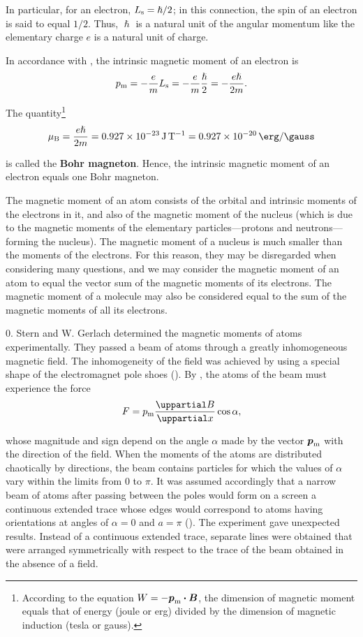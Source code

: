 \noindent
In particular, for an electron, $L_{\text{s}}=\hslash/2$; in this connection, the spin of an electron is said to equal $1/2$.
Thus, $\hslash$ is a natural unit of the angular momentum like the elementary charge $e$ is a natural unit of charge.

In accordance with , the intrinsic magnetic moment of an electron is
\begin{equation}\label{eq:7_44}
    p_{\text{m}} = - \frac{e}{m} L_{\text{s}} = - \frac{e}{m} \frac{\hslash}{2} = - \frac{e\hslash}{2m}.
\end{equation}

\noindent
The quantity\footnote{According to the equation $W=-\boldsymbol{p}_{\text{m}}\boldsymbol{\cdot}\boldsymbol{B}$, the dimension of magnetic moment equals that of energy (joule or erg) divided by the dimension of magnetic induction (tesla or gauss).}
\begin{equation}\label{eq:7_45}
    \ab{\mu}{B} = \frac{e\hslash}{2m} = \SI{0.927e-23}{\joule\per\tesla} = \SI{0.927e-20}{\erg\per\gauss}
\end{equation}

\noindent
is called the \textbf{Bohr magneton}.
Hence, the intrinsic magnetic moment of an electron equals one Bohr magneton.

The magnetic moment of an atom consists of the orbital and intrinsic moments of the electrons in it, and also of the magnetic moment of the nucleus (which is due to the magnetic moments of the elementary particles---protons and neutrons---forming
the nucleus).
The magnetic moment of a nucleus is much smaller than
the moments of the electrons.
For this reason, they may be disregarded when considering many questions, and we may consider the magnetic moment of an atom to equal the vector sum of the magnetic moments of its electrons.
The magnetic moment of a molecule may also be considered equal to the sum of the magnetic moments of all its electrons.

0. Stern and W. Gerlach determined the magnetic moments of atoms experimentally.
They passed a beam of atoms through a greatly inhomogeneous magnetic field.
The inhomogeneity of the field was achieved by using a special shape of the electromagnet pole shoes ().
By , the atoms of the beam must experience the force
\begin{equation*}
    F = \ab{p}{m} \diffpartial{B}{x} \cos\alpha,
\end{equation*}

\noindent
whose magnitude and sign depend on the angle $\alpha$ made by the vector $\boldsymbol{p}_{\text{m}}$ with the direction of the field.
When the moments of the atoms are distributed chaotically by directions, the beam contains particles for which the values of $\alpha$ vary within the limits from $0$ to $\pi$.
It was assumed accordingly that a narrow beam of atoms after passing between the poles would form on a screen a continuous extended trace whose edges would correspond to atoms having orientations at angles of $\alpha=0$ and $a=\pi$ ().
The experiment gave unexpected results.
Instead of a continuous extended trace, separate lines were obtained that were arranged symmetrically with respect to the trace of the beam obtained in the absence of a field.

